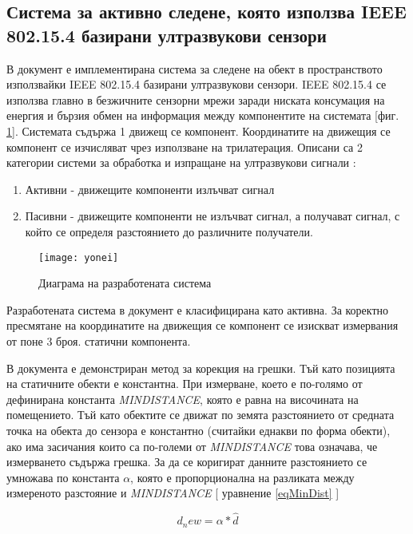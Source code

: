 \subsection{Система за активно следене, която използва IEEE 802.15.4 базирани ултразвукови сензори} \label{yoneiSection}

В документ \cite{yonei} е имплементирана система за следене на обект в пространството използвайки IEEE 802.15.4 базирани ултразвукови сензори.
IEEE 802.15.4 се използва главно в безжичните сензорни мрежи заради ниската консумация на енергия и бързия обмен на информация между компонентите на системата [фиг. \ref{fig:yoneiFig}]. Системата съдържа 1 движещ се компонент. Координатите на движещия се компонент се изчисляват чрез използване на трилатерация.  Описани са 2 категории системи за обработка и изпращане на ултразвукови сигнали \cite{sysTypes}:

\begin{enumerate}
    \item Активни - движещите компоненти излъчват сигнал
    \item Пасивни - движещите компоненти не излъчват сигнал, а получават сигнал, с който се определя разстоянието до различните получатели.
\end{enumerate}

\begin{figure}
    \centering
    \texttt{[image: yonei]}
    \caption{Диаграма на разработената система}
    \label{fig:yoneiFig}
\end{figure}

Разработената система в документ \cite{yonei} е класифицирана като активна. За коректно пресмятане на координатите на движещия се компонент се изискват измервания от поне 3 броя. статични компонента. 

В документа е демонстриран метод за корекция на грешки. Тъй като позицията на статичните обекти е константна. При измерване, което е по-голямо от дефинирана константа \textit{MINDISTANCE}, която е равна на височината на помещението. Тъй като обектите се движат по земята разстоянието от средната точка на обекта до сензора е константно (считайки еднакви по форма обекти), ако има засичания които са по-големи от \textit{MINDISTANCE} това означава, че измерването съдържа грешка. За да се коригират данните разстоянието се умножава по константа $\alpha$, която е пропорционална на разликата между измереното разстояние и \textit{MINDISTANCE} [ уравнение \ref{eqMinDist} ]

\begin{equation} \label{eqMinDist}
    d_new = \alpha * \hat{d}
\end{equation}